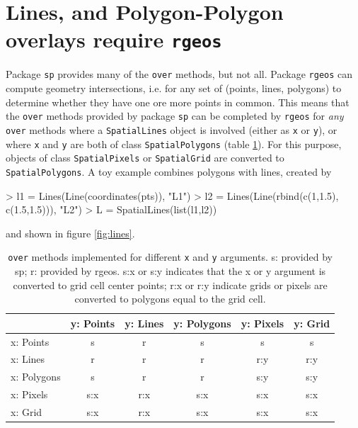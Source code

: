 \documentclass{article}
\newcommand{\strong}[1]{{\normalfont\fontseries{b}\selectfont #1}}
\newcommand{\code}[1]{{\tt #1}}
\let\pkg=\strong
\begin{document}
\section{Lines, and Polygon-Polygon overlays require {\tt rgeos}}

Package \code{sp} provides many of the \code{over} methods, but
not all.  Package \code{rgeos} can compute
geometry intersections, i.e. for any set of (points, lines,
polygons) to determine whether they have one ore more points in
common. This means that the \code{over} methods provided by package 
\code{sp}
can be completed by \code{rgeos} for {\em any} \code{over} methods
where a \code{SpatialLines} object is involved (either as \code{x}
or \code{y}), or where \code{x} and \code{y} are both of
class \code{SpatialPolygons} (table \ref{tab}). For this purpose,
objects of class \code{SpatialPixels} or \code{SpatialGrid} are
converted to \code{SpatialPolygons}. A toy example combines polygons
with lines, created by
\begin{Schunk}
\begin{Sinput}
> l1 = Lines(Line(coordinates(pts)), "L1")
> l2 = Lines(Line(rbind(c(1,1.5), c(1.5,1.5))), "L2")
> L = SpatialLines(list(l1,l2))
\end{Sinput}
\end{Schunk}
and shown in figure \ref{fig:lines}.

\begin{table}
\centering
\begin{tabular}{|l|ccccc|} \hline
              & y: Points & y: Lines & y: Polygons & y: Pixels & y: Grid \\
              \hline
x: Points        &   s    &    r     &      s      &      s    &  s  \\
x: Lines         &   r    &    r     &      r      &     r:y   & r:y \\
x: Polygons      &   s    &    r     &      r      &     s:y   & s:y \\
x: Pixels        &  s:x   &   r:x    &     s:x     &     s:x   & s:x \\ \hline
x: Grid          &  s:x   &   r:x    &     s:x     &     s:x   & s:x \\ \hline
\end{tabular}
\caption{ \code{over} methods implemented for different \code{x}
and \code{y} arguments.  s: provided by \pkg{sp}; r: provided by
\pkg{rgeos}. s:x or s:y indicates that the x or y argument is converted to grid
cell center points; r:x or r:y indicate grids or pixels are converted to
polygons equal to the grid cell. }
\label{tab}
\end{table}
\end{document}

